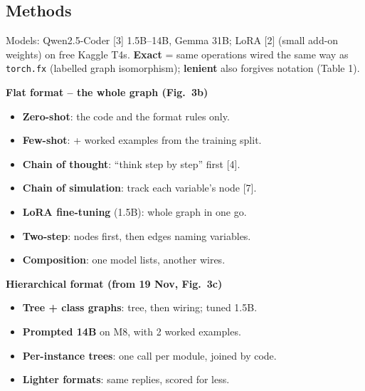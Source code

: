 \documentclass[
  t,%
]{_style/tudelft-beamerposter}
\newcommand{\tg}[1]{\textcolor{tagc}{\textbf{[#1]}}}
\begin{document}
\begin{frame}
  \section*{Methods}
  Models: Qwen2.5-Coder [3] 1.5B--14B, Gemma 31B; LoRA [2] (small add-on weights) on free Kaggle T4s.
  \textbf{Exact} = same operations wired the same way as \texttt{torch.fx} (labelled graph isomorphism);
  \textbf{lenient} also forgives notation (Table 1).\\[1ex]
  \begin{minipage}[t]{0.31\linewidth}
    \vspace{0pt}
    \textbf{Flat format -- the whole graph (Fig.~3b)}
    \begin{itemize}
      \item[\tg{M1}] \textbf{Zero-shot}: the code and the format rules only.
      \item[\tg{M2}] \textbf{Few-shot}: + worked examples from the training split.
      \item[\tg{M3}] \textbf{Chain of thought}: ``think step by step'' first [4].
      \item[\tg{M4}] \textbf{Chain of simulation}: track each variable's node [7].
      \item[\tg{M5}] \textbf{LoRA fine-tuning} (1.5B): whole graph in one go.
      \item[\tg{M6}] \textbf{Two-step}: nodes first, then edges naming variables.
      \item[\tg{M7}] \textbf{Composition}: one model lists, another wires.
    \end{itemize}
  \end{minipage}\hfill
  \begin{minipage}[t]{0.29\linewidth}
    \vspace{0pt}
    \textbf{Hierarchical format (from 19 Nov, Fig.~3c)}
    \begin{itemize}
      \item[\tg{M8}] \textbf{Tree + class graphs}: tree, then wiring; tuned 1.5B.
      \item[\tg{M9}] \textbf{Prompted 14B} on M8, with 2 worked examples.
      \item[\tg{M10}] \textbf{Per-instance trees}: one call per module, joined by code.
      \item[\tg{M11}] \textbf{Lighter formats}: same replies, scored for less.
    \end{itemize}
  \end{minipage}\hfill

\end{frame}
\end{document}

